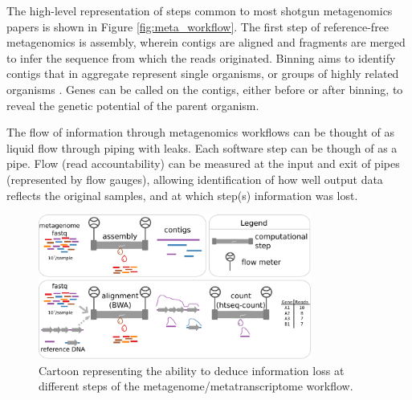 The high-level representation of steps common to most shotgun metagenomics papers is shown in Figure \ref{fig:meta_workflow}.
The first step of reference-free metagenomics is assembly, wherein contigs are aligned and fragments are merged to infer the sequence from which the reads originated.
Binning aims to identify contigs that in aggregate represent single organisms, or groups of highly related organisms \cite{kunin2008}.
Genes can be called on the contigs, either before or after binning, to reveal the genetic potential of the parent organism.

The flow of information through metagenomics workflows can be thought of as liquid flow through piping with leaks.
Each software step can be though of as a pipe.
Flow (read accountability) can be measured at the input and exit of pipes (represented by flow gauges), allowing identification of how well output data reflects the original samples, and at which step(s) information was lost.


\begin{figure}[H]
\centering
     \includegraphics[width=0.8\textwidth]{./tex/chapter2/figures/170312_pipe_leaks.pdf}
     \begin{singlespace}
     \caption[Framework for assessing information loss in workflow steps.]{
       	Cartoon representing the ability to deduce information loss at different steps of the metagenome/metatranscriptome workflow.}
     \label{fig:pipe_leaks}
     \end{singlespace}
\end{figure}

